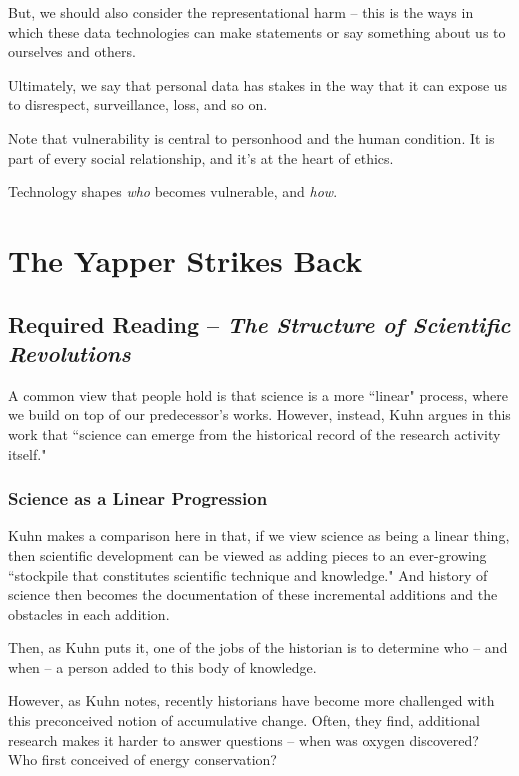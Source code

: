\documentclass[openany]{book}
\begin{document}
But, we should also consider the representational harm -- this is the ways in which these data technologies can make statements or say something about us to ourselves and others.

Ultimately, we say that personal data has stakes in the way that it can expose us to disrespect, surveillance, loss, and so on.

\begin{warn}
	Note that vulnerability is central to personhood and the human condition. It is part of every social relationship, and it's at the heart of ethics.
	
	Technology shapes \textit{who} becomes vulnerable, and \textit{how}.
\end{warn}

\chapter{The Yapper Strikes Back}
\section{Required Reading -- \textit{The Structure of Scientific Revolutions}}
A common view that people hold is that science is a more ``linear" process, where we build on top of our predecessor's works. However, instead, Kuhn argues in this work that ``science can emerge from the historical record of the research activity itself."

\subsection{Science as a Linear Progression}
Kuhn makes a comparison here in that, if we view science as being a linear thing, then scientific development can be viewed as adding pieces to an ever-growing ``stockpile that constitutes scientific technique and knowledge." And history of science then becomes the documentation of these incremental additions and the obstacles in each addition.

Then, as Kuhn puts it, one of the jobs of the historian is to determine who -- and when -- a person added to this body of knowledge.

However, as Kuhn notes, recently historians have become more challenged with this preconceived notion of accumulative change. Often, they find, additional research makes it harder to answer questions -- when was oxygen discovered? Who first conceived of energy conservation?
\end{document}
